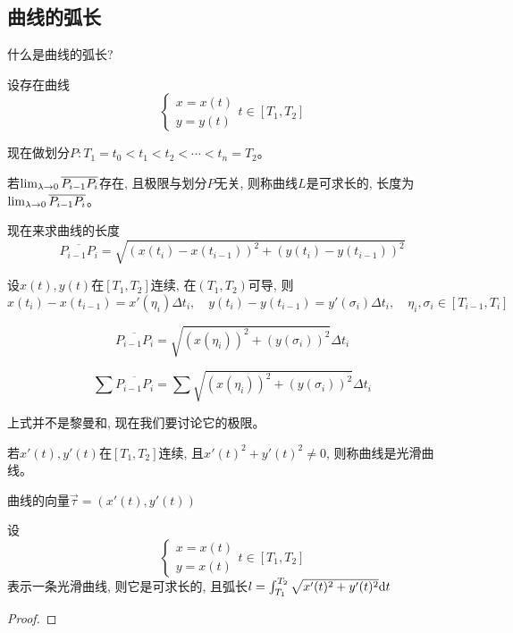 \subsection{曲线的弧长}
什么是曲线的弧长?

设存在曲线
\begin{equation*}
    \begin{cases}
        x = x(t) \\
        y = y(t)
    \end{cases}
    t \in [T_1, T_2]
\end{equation*}

现在做划分$P: T_1 = t_0 < t_1 < t_2<\cdots<t_n=T_2$。

若$\lim_{\lambda \to 0 } \overline{P_{i-1}P_i}$存在, 且极限与划分$P$无关, 则称曲线$L$是可求长的, 长度为$\lim_{\lambda \to 0 } \overline{P_{i-1}P_i}$。

现在来求曲线的长度
\begin{equation*}
    \overline{P_{i-1}P_i} = \sqrt{(x(t_i)-x(t_{i-1}))^2+(y(t_i)-y(t_{i-1}))^2}
\end{equation*}

设$x(t), y(t)$在$[T_1, T_2]$连续, 在$(T_1, T_2)$可导, 则
\begin{equation*}
    x(t_i) - x(t_{i-1}) = x'(\eta_i)\Delta t_i, \quad y(t_i) - y(t_{i-1}) = y'(\sigma_i)\Delta t_i, \quad \eta_i, \sigma_i \in [T_{i-1}, T_i]
\end{equation*}

\begin{equation*}
    \overline{P_{i-1}P_i} = \sqrt{(x(\eta_i))^2+(y(\sigma_i))^2} \Delta t_i
\end{equation*}

\begin{equation*}
    \sum\overline{P_{i-1}P_i} = \sum \sqrt{(x(\eta_i))^2+(y(\sigma_i))^2} \Delta t_i
\end{equation*}

上式并不是黎曼和, 现在我们要讨论它的极限。

\begin{definition}
    若$x'(t), y'(t)$在$[T_1, T_2]$连续, 且$x'(t)^2+y'(t)^2 \neq 0$, 则称曲线是光滑曲线。
\end{definition}
\begin{remark}
    曲线的向量$\vec{\tau} = (x'(t), y'(t))$
\end{remark}

\begin{theorem}
    设
    \begin{equation*}
        \begin{cases}
            x = x(t) \\
            y = x(t)
        \end{cases}
        t \in [T_1, T_2]
    \end{equation*}
    表示一条光滑曲线, 则它是可求长的, 且弧长$l = \int_{T_1}^{T_2}\sqrt{x'(t)^2 + y'(t)^2} \mathrm{d} t$
\end{theorem}
\begin{proof}
    
\end{proof}

